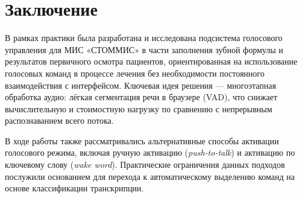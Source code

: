 



\clearpage
\section{Заключение}
\label{sec:conclusion}

В рамках практики была разработана и исследована подсистема голосового управления для МИС «СТОММИС» в части заполнения зубной формулы и результатов первичного осмотра пациентов, ориентированная на использование голосовых команд в процессе лечения без необходимости постоянного взаимодействия с интерфейсом.
Ключевая идея решения --- многоэтапная обработка аудио: лёгкая сегментация речи в браузере (VAD), что снижает вычислительную и стоимостную нагрузку по сравнению с непрерывным распознаванием всего потока.

В ходе работы также рассматривались альтернативные способы активации голосового режима, включая ручную активацию (\emph{push-to-talk}) и активацию по ключевому слову (\emph{wake word}).
Практические ограничения данных подходов послужили основанием для перехода к автоматическому выделению команд на основе классификации транскрипции.

